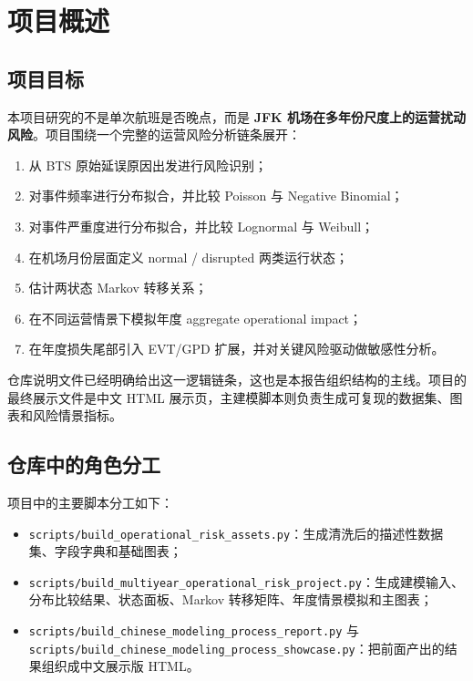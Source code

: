 \section{项目概述}

\subsection{项目目标}

本项目研究的不是单次航班是否晚点，而是 \textbf{JFK 机场在多年份尺度上的运营扰动风险}。项目围绕一个完整的运营风险分析链条展开：
\begin{enumerate}[leftmargin=2.2em]
  \item 从 BTS 原始延误原因出发进行风险识别；
  \item 对事件频率进行分布拟合，并比较 Poisson 与 Negative Binomial；
  \item 对事件严重度进行分布拟合，并比较 Lognormal 与 Weibull；
  \item 在机场月份层面定义 normal / disrupted 两类运行状态；
  \item 估计两状态 Markov 转移关系；
  \item 在不同运营情景下模拟年度 aggregate operational impact；
  \item 在年度损失尾部引入 EVT/GPD 扩展，并对关键风险驱动做敏感性分析。
\end{enumerate}

仓库说明文件已经明确给出这一逻辑链条，这也是本报告组织结构的主线。项目的最终展示文件是中文 HTML 展示页，主建模脚本则负责生成可复现的数据集、图表和风险情景指标。

\subsection{仓库中的角色分工}

项目中的主要脚本分工如下：
\begin{itemize}[leftmargin=2.2em]
  \item \texttt{scripts/build\_operational\_risk\_assets.py}：生成清洗后的描述性数据集、字段字典和基础图表；
  \item \texttt{scripts/build\_multiyear\_operational\_risk\_project.py}：生成建模输入、分布比较结果、状态面板、Markov 转移矩阵、年度情景模拟和主图表；
  \item \texttt{scripts/build\_chinese\_modeling\_process\_report.py} 与 \texttt{scripts/build\_chinese\_modeling\_process\_showcase.py}：把前面产出的结果组织成中文展示版 HTML。
\end{itemize}

